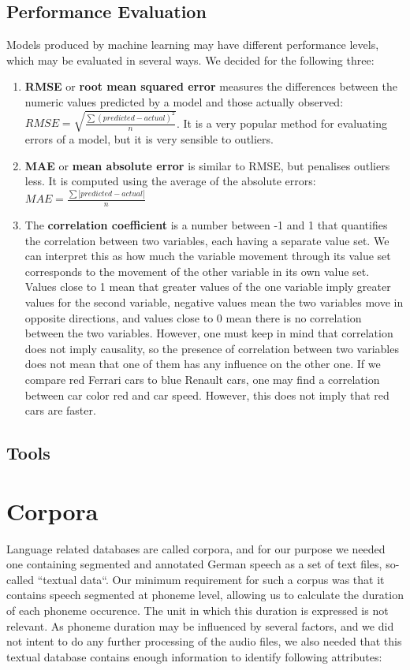 \documentclass[a4paper]{scrreprt}
\begin{document}
\section{Performance Evaluation}
Models produced by machine learning may have different performance levels, which may be evaluated in several ways. We decided for the following three:
\begin{enumerate}
	\item \textbf{RMSE} or \textbf{root mean squared error} measures the differences between the numeric values predicted by a model and those actually observed: 
$RMSE = \sqrt{\frac{\sum(predicted-actual)^2}{n}}$. It is a very popular method for evaluating errors of a model, but it is very sensible to outliers.
	\item \textbf{MAE} or \textbf{mean absolute error} is similar to RMSE, but penalises outliers less. It is computed using the average of the absolute errors: $MAE = \frac{\sum\left|predicted-actual\right|}{n}$
	\item The \textbf{correlation coefficient} is a number between -1 and 1 that quantifies the correlation between two variables, each having a separate value set. We can interpret this as how much the variable movement through its value set corresponds to the movement of the other variable in its own value set. Values close to 1 mean that greater values of the one variable imply greater values for the second variable, negative values mean the two variables move in opposite directions, and values close to 0 mean there is no correlation between the two variables. However, one must keep in mind that correlation does not imply causality, so the presence of correlation between two variables does not mean that one of them has any influence on the other one. If we compare red Ferrari cars to blue Renault cars, one may find a correlation between car color red and car speed. However, this does not imply that red cars are faster.
\end{enumerate}

\section{Tools}

\chapter{Corpora}
Language related databases are called corpora, and for our purpose we needed one containing segmented and annotated German speech as a set of text files, so-called ``textual data``. Our minimum requirement for such a corpus was that it contains speech segmented at phoneme level, allowing us to calculate the duration of each phoneme occurence. The unit in which this duration is expressed is not relevant. As phoneme duration may be influenced by several factors, and we did not intent to do any further processing of the audio files, we also needed that this textual database contains enough information to identify following attributes: 
\end{document}
